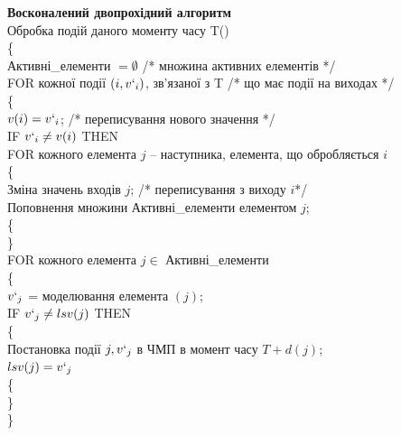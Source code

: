 \documentclass[12pt,a4paper]{article}
\begin{document}
\textbf{Восконалений двопрохідний алгоритм}\\
Обробка подій даного моменту часу T()\\
\{\\
\-\hspace{1cm}  Активні_елементи $=\emptyset$ /* множина активних елементів */\\
\-\hspace{1cm}  FOR кожної події $(i, v`_i)$, зв’язаної з T /* що має події на виходах */\\
\-\hspace{1cm}  \{\\
\-\hspace{1cm}    $v(i) = v`_i$; /* переписування нового значення */\\
\-\hspace{1cm}    IF $v`_i \neq v(i)$ THEN\\
\-\hspace{1cm}    FOR кожного елемента $j$ -- наступника, елемента, що обробляється $i$\\
\-\hspace{1cm}    \{\\
\-\hspace{1cm}      Зміна значень входів $j$; /* переписування з виходу $i$*/\\
\-\hspace{1cm}      Поповнення множини Активні_елементи елементом $j$;\\
\-\hspace{1cm}    \{\\
\-\hspace{1cm}  \}\\
\-\hspace{1cm}  FOR кожного елемента $j\in$ Активні_елементи\\
\-\hspace{1cm}  \{\\
\-\hspace{1cm}    $v`_j$ = моделювання елемента $(j)$;\\
\-\hspace{1cm}    IF $v`_j \neq lsv(j)$ THEN\\
\-\hspace{1cm}    \{\\
\-\hspace{1cm}      Постановка події $j, v`_j$ в ЧМП в момент часу $T+d(j)$;\\
\-\hspace{1cm}      $lsv(j)=v`_j$\\
\-\hspace{1cm}    \{\\
\-\hspace{1cm}  \}\\
\}
\end{document}
